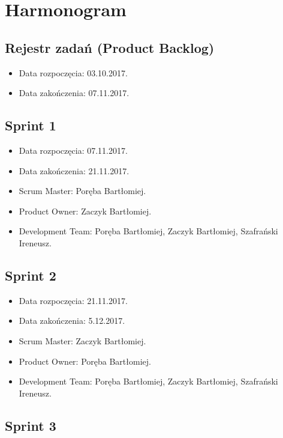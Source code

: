 \documentclass[a4paper]{article}
\begin{document}
\section{Harmonogram}

\subsection{Rejestr zadań (Product Backlog)}

\begin{itemize}
\item Data rozpoczęcia: 03.10.2017.
\item  Data zakończenia: 07.11.2017.
\end{itemize}

\subsection{Sprint 1}

\begin{itemize}
\item Data rozpoczęcia: 07.11.2017.
\item Data zakończenia: 21.11.2017.
\item Scrum Master: Poręba Bartłomiej.
\item Product Owner: Zaczyk Bartłomiej.
\item Development Team: Poręba Bartłomiej, Zaczyk Bartłomiej, Szafrański Ireneusz.
\end{itemize}

\subsection{Sprint 2}

\begin{itemize}
\item Data rozpoczęcia: 21.11.2017.
\item  Data zakończenia: 5.12.2017.
\item Scrum Master: Zaczyk Bartłomiej.
\item Product Owner: Poręba Bartłomiej.
\item Development Team: Poręba Bartłomiej, Zaczyk Bartłomiej, Szafrański Ireneusz.
\end{itemize}

\subsection{Sprint 3}
\end{document}
